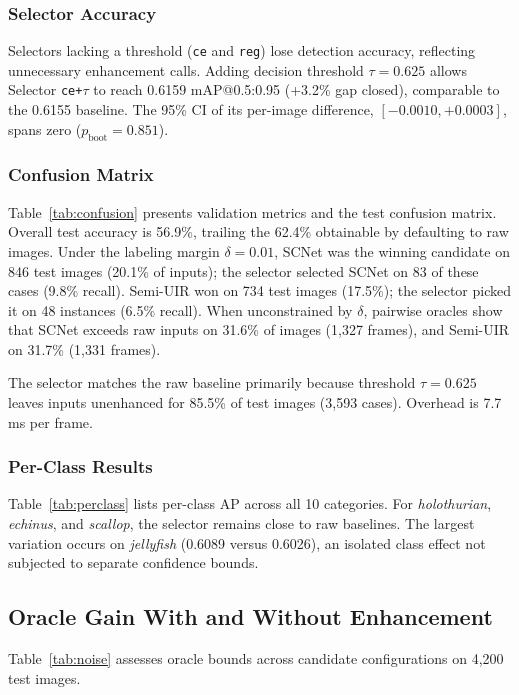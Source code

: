 \documentclass[runningheads]{llncs}
\begin{document}
\subsubsection{Selector Accuracy}
Selectors lacking a threshold (\texttt{ce} and \texttt{reg}) lose detection accuracy, reflecting unnecessary enhancement calls. Adding decision threshold $\tau = 0.625$ allows Selector \texttt{ce+$\tau$} to reach 0.6159 mAP@0.5:0.95 (+3.2\% gap closed), comparable to the 0.6155 baseline. The 95\% CI of its per-image difference, $[-0.0010, +0.0003]$, spans zero ($p_{\text{boot}} = 0.851$).

\subsubsection{Confusion Matrix}
Table~\ref{tab:confusion} presents validation metrics and the test confusion matrix. Overall test accuracy is 56.9\%, trailing the 62.4\% obtainable by defaulting to raw images. Under the labeling margin $\delta = 0.01$, SCNet was the winning candidate on 846 test images (20.1\% of inputs); the selector selected SCNet on 83 of these cases (9.8\% recall). Semi-UIR won on 734 test images (17.5\%); the selector picked it on 48 instances (6.5\% recall). When unconstrained by $\delta$, pairwise oracles show that SCNet exceeds raw inputs on 31.6\% of images (1{,}327 frames), and Semi-UIR on 31.7\% (1{,}331 frames).

The selector matches the raw baseline primarily because threshold $\tau = 0.625$ leaves inputs unenhanced for 85.5\% of test images (3{,}593 cases). Overhead is 7.7\,ms per frame.

\subsubsection{Per-Class Results}
Table~\ref{tab:perclass} lists per-class AP across all 10 categories. For \emph{holothurian}, \emph{echinus}, and \emph{scallop}, the selector remains close to raw baselines. The largest variation occurs on \emph{jellyfish} (0.6089 versus 0.6026), an isolated class effect not subjected to separate confidence bounds.

\subsection{Oracle Gain With and Without Enhancement}
\label{sec:res-noise}

Table~\ref{tab:noise} assesses oracle bounds across candidate configurations on 4{,}200 test images.
\end{document}
